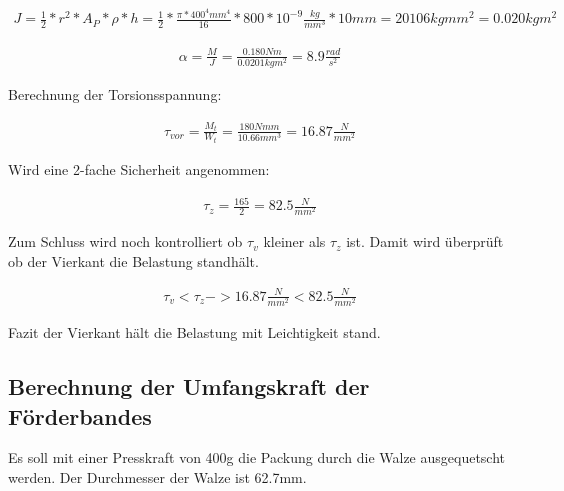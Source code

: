 \begin{align*}
J = \frac{1}{2}*r^{2}*A_{ P }*\rho*h=\frac{1}{2}*\frac{ \pi*400^{4}mm^{4} }{16}*800*10^{-9}\frac{ kg }{ mm^{3} }*10mm= 20106kg mm^{2} = 0.020kg m^{2}
\end{align*}

\begin{align*}
\alpha = \frac{ M }{ J }=\frac{ 0.180Nm }{ 0.0201kgm^{2} } = 8.9 \frac{ rad }{ s^{2} }
\end{align*}

Berechnung der Torsionsspannung:

\begin{align*}
\tau_{ vor } = \frac{ M_{ t } }{W_{ t } } = \frac{ 180 Nmm }{ 10.66 mm^{3} } = 16.87\frac{ N }{mm^{2}}
\end{align*}

Wird eine 2-fache Sicherheit angenommen:

\begin{align*}
\tau_z=\frac{165}{2}=82.5\frac{N}{mm^{2}}
\end{align*}

Zum Schluss wird noch kontrolliert ob $\tau_v$ kleiner als $\tau_z$ ist.
Damit wird überprüft ob der Vierkant die Belastung standhält.

\begin{align*}
\tau_v < \tau_z  ->  16.87 \frac{N}{mm^{2}} < 82.5\frac{N}{mm^{2}}
\end{align*}

Fazit der Vierkant hält die Belastung mit Leichtigkeit stand.

\subsection{Berechnung der Umfangskraft der Förderbandes}

Es soll mit einer Presskraft von 400g die Packung durch die Walze ausgequetscht werden. Der Durchmesser der Walze ist 62.7mm.


